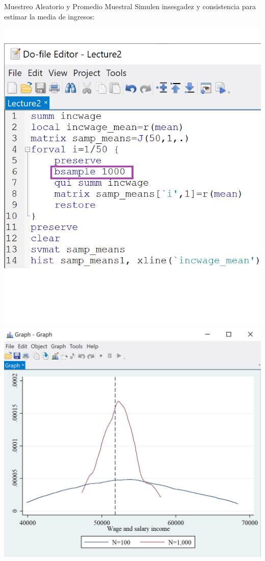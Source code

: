 \documentclass[11pt,handout,aspectratio=169]{beamer}
\begin{document}
\begin{frame}{Muestreo Aleatorio y Promedio Muestral}
\vspace{0.2cm}
Simulen insesgadez  y consistencia para estimar la media de ingresos:

\begin{center}
\includegraphics[scale=0.45]{stata18b.png} \includegraphics[scale=0.5]{stata23.png}
\end{center}

\end{frame}
\end{document}
